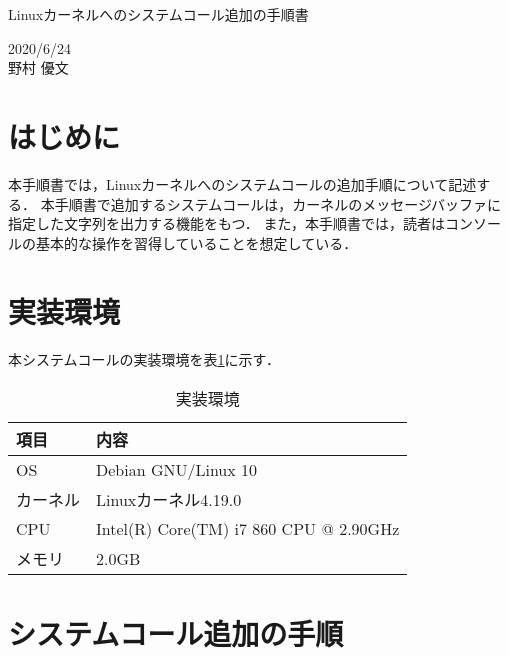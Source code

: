 \documentclass[12pt]{jsarticle}
\begin{document}
\begin{center}
  {\LARGE Linuxカーネルへのシステムコール追加の手順書}
\end{center}

\begin{flushright}
  2020/6/24\\
  野村 優文
\end{flushright}
\section{はじめに}
本手順書では，Linuxカーネルへのシステムコールの追加手順について記述する．
本手順書で追加するシステムコールは，カーネルのメッセージバッファに指定した文字列を出力する機能をもつ．
また，本手順書では，読者はコンソールの基本的な操作を習得していることを想定している．

\section{実装環境}
本システムコールの実装環境を表\ref{tab:2}に示す．

\begin{table}[h]
  \begin{center}
    \caption{実装環境}\label{tab:2}
    \begin{tabular}{l|l}
      \hline\hline
      \multicolumn{1}{l|}{項目} & \multicolumn{1}{l}{内容}\\
      \hline
      OS & Debian GNU/Linux 10\\
      カーネル & Linuxカーネル4.19.0\\
      CPU & Intel(R) Core(TM) i7 860 CPU @ 2.90GHz\\
      メモリ & 2.0GB\\
      \hline
    \end{tabular}
  \end{center}
\end{table}


\section{システムコール追加の手順}
\end{document}
